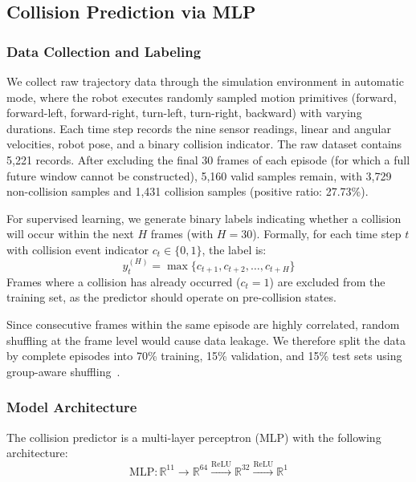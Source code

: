 \documentclass[conference]{IEEEtran}
\begin{document}
\subsection{Collision Prediction via MLP}

\subsubsection{Data Collection and Labeling}

We collect raw trajectory data through the simulation environment in automatic mode, where the robot executes randomly sampled motion primitives (forward, forward-left, forward-right, turn-left, turn-right, backward) with varying durations. Each time step records the nine sensor readings, linear and angular velocities, robot pose, and a binary collision indicator. The raw dataset contains 5,221 records. After excluding the final 30 frames of each episode (for which a full future window cannot be constructed), 5,160 valid samples remain, with 3,729 non-collision samples and 1,431 collision samples (positive ratio: 27.73\%).

For supervised learning, we generate binary labels indicating whether a collision will occur within the next $H$ frames (with $H = 30$). Formally, for each time step $t$ with collision event indicator $c_t \in \{0, 1\}$, the label is:
\begin{equation}
    y_t^{(H)} = \max\{c_{t+1}, c_{t+2}, \ldots, c_{t+H}\}
\end{equation}
Frames where a collision has already occurred ($c_t = 1$) are excluded from the training set, as the predictor should operate on pre-collision states.

Since consecutive frames within the same episode are highly correlated, random shuffling at the frame level would cause data leakage. We therefore split the data by complete episodes into 70\% training, 15\% validation, and 15\% test sets using group-aware shuffling~\cite{raffin2021stable}.

\subsubsection{Model Architecture}

The collision predictor is a multi-layer perceptron (MLP) with the following architecture:
\begin{equation}
    \text{MLP}: \mathbb{R}^{11} \rightarrow \mathbb{R}^{64} \xrightarrow{\text{ReLU}} \mathbb{R}^{32} \xrightarrow{\text{ReLU}} \mathbb{R}^{1}
\end{equation}
\end{document}
